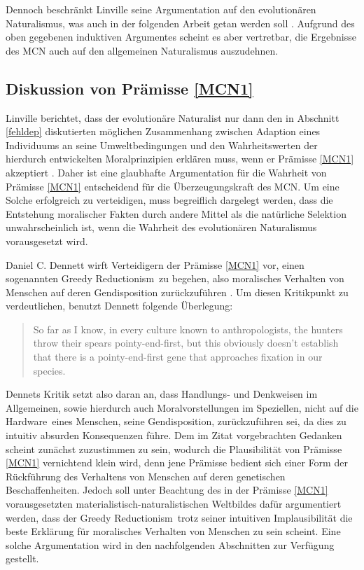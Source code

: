 \documentclass[a4paper,11pt]{article}
\numberwithin{equation}{section}
\begin{document}
Dennoch beschränkt Linville seine Argumentation auf den evolutionären Naturalismus, was auch in der folgenden Arbeit getan werden soll \cite[S. 394-395]{Linville2009-LINTMA-2}. Aufgrund des oben gegebenen induktiven Argumentes scheint es aber vertretbar, die Ergebnisse des MCN auch auf den allgemeinen Naturalismus auszudehnen.


\subsection{Diskussion von Prämisse \ref{MCN1}}

Linville berichtet, dass der evolutionäre Naturalist nur dann den in Abschnitt \ref{fehldep} diskutierten möglichen Zusammenhang zwischen Adaption eines Individuums an seine Umweltbedingungen und den Wahrheitswerten der hierdurch entwickelten Moralprinzipien erklären muss, wenn er Prämisse \ref{MCN1} akzeptiert \cite[S. 398]{Linville2009-LINTMA-2}. Daher ist eine glaubhafte Argumentation für die Wahrheit von Prämisse \ref{MCN1} entscheidend für die Überzeugungskraft des MCN. Um eine Solche erfolgreich zu verteidigen, muss begreiflich dargelegt werden, dass die Entstehung moralischer Fakten durch andere Mittel als die natürliche Selektion unwahrscheinlich ist, wenn die Wahrheit des evolutionären Naturalismus vorausgesetzt wird.

Daniel C. Dennett wirft Verteidigern der Prämisse \ref{MCN1} vor, einen sogenannten \flqq Greedy Reductionism\frqq\ zu begehen, also moralisches Verhalten von Menschen auf deren Gendisposition zurückzuführen \cite[S. 82]{Dennett.1995}. Um diesen Kritikpunkt zu verdeutlichen, benutzt Dennett folgende Überlegung:
\begin{quote}
\flqq So far as I know, in every culture known to 
anthropologists, the hunters throw their spears pointy-end-first, but this 
obviously doesn't establish that there is a pointy-end-first gene that 
approaches fixation in our species\frqq.\ \cite[S. 486]{Dennett.1995}
\end{quote}
Dennets Kritik setzt also daran an, dass Handlungs- und Denkweisen im Allgemeinen, sowie hierdurch auch Moralvorstellungen im Speziellen, nicht auf die \flqq Hardware\frqq\ eines Menschen, seine Gendisposition, zurückzuführen sei, da dies zu intuitiv absurden Konsequenzen führe.
Dem im Zitat vorgebrachten Gedanken scheint zunächst zuzustimmen zu sein, wodurch die Plausibilität von Prämisse \ref{MCN1} vernichtend klein wird, denn jene Prämisse bedient sich einer Form der Rückführung des Verhaltens von Menschen auf deren genetischen Beschaffenheiten. Jedoch soll unter Beachtung des in der Prämisse \ref{MCN1} vorausgesetzten materialistisch-naturalistischen Weltbildes dafür argumentiert werden, dass der \flqq Greedy Reductionism\frqq\ trotz seiner intuitiven Implausibilität die beste Erklärung für moralisches Verhalten von Menschen zu sein scheint. Eine solche Argumentation wird in den nachfolgenden Abschnitten zur Verfügung gestellt.
\end{document}
